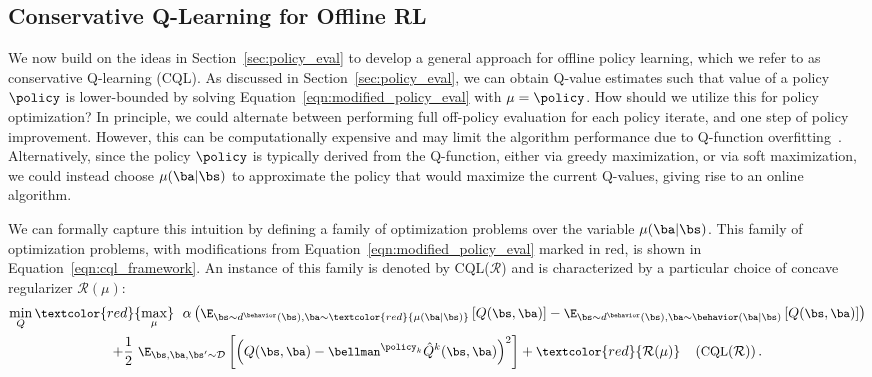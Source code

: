 \vspace{-5pt}
\subsection{Conservative Q-Learning for Offline RL}
\label{sec:framework}

We now build on the ideas in Section~\ref{sec:policy_eval}
to develop a general approach for offline policy learning, which we refer to as conservative Q-learning (CQL). 
As discussed in Section~\ref{sec:policy_eval}, we can obtain Q-value estimates such that value of a policy $\policy$
is lower-bounded by solving Equation~\ref{eqn:modified_policy_eval} with $\mu = \policy$. How should we utilize this for policy optimization? In principle, we could alternate between performing full off-policy evaluation for each policy iterate, and one step of policy improvement. However, this can be computationally expensive and may limit the algorithm performance due to Q-function overfitting~\citep{fu2019diagnosing}. Alternatively, since the policy $\policy$ is typically derived from the Q-function, either via greedy maximization, 
or via soft maximization, we could instead choose $\mu(\ba|\bs)$ to approximate the policy that would maximize the current Q-values, giving rise to an online algorithm.

We can formally capture this intuition by defining a family of optimization problems over the variable $\mu(\ba|\bs)$.
This family of optimization problems, with modifications from Equation~\ref{eqn:modified_policy_eval} marked in red, is shown in Equation~\ref{eqn:cql_framework}. An instance of this family is denoted by CQL($\mathcal{R}$) and is characterized by a particular choice of concave regularizer $\mathcal{R}(\mu)$:
\begin{multline}
    \label{eqn:cql_framework}
    \small{\min_{Q} \textcolor{red}{\max_{\mu}}~~ \alpha \left(\E_{\bs \sim d^\behavior(\bs), \ba \sim \textcolor{red}{\mu(\ba|\bs)}}\left[Q(\bs, \ba)\right] - \E_{\bs \sim d^\behavior(\bs), \ba \sim \behavior(\ba|\bs)}\left[Q(\bs, \ba)\right] \right)}\\
    \small{+ \frac{1}{2}~ \E_{\bs, \ba, \bs' \sim \mathcal{D}}\left[\left(Q(\bs, \ba) - \bellman^{\policy_k} \hat{Q}^{k} (\bs, \ba) \right)^2 \right] + \textcolor{red}{\mathcal{R}(\mu)} ~~~ \left(\text{CQL}(\mathcal{R})\right).}
\end{multline}

